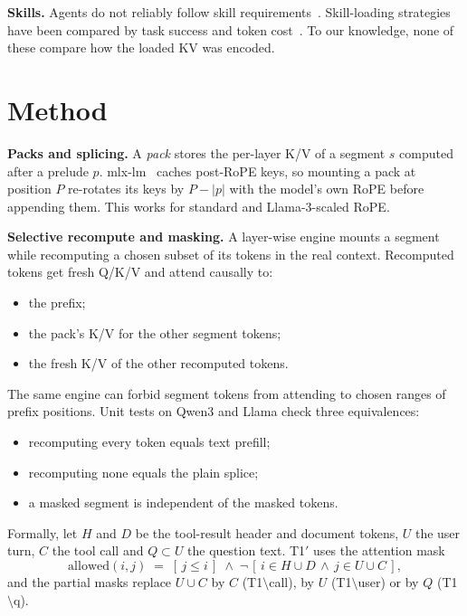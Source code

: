 \documentclass[10pt]{article}
\newcommand{\cond}[1]{\textsf{#1}}
\newcommand{\Mcall}{\cond{T1$\setminus$call}}
\newcommand{\Muser}{\cond{T1$\setminus$user}}
\newcommand{\Mq}{\cond{T1$\setminus$q}}
\begin{document}
\textbf{Skills.} Agents do not reliably follow skill requirements~\citep{li2026hexis}. Skill-loading strategies have been compared
by task success and token cost~\citep{zhang2026progressive,nakasuji2026skillblocks}. To our knowledge, none of these compare how
the loaded KV was encoded.

\section{Method}\label{sec:method}
\textbf{Packs and splicing.} A \emph{pack} stores the per-layer K/V of a segment $s$ computed after a prelude $p$.
mlx-lm~\citep{hannun2023mlx} caches post-RoPE keys, so mounting a pack at position $P$ re-rotates its keys by $P-|p|$ with the
model's own RoPE before appending them. This works for standard and Llama-3-scaled RoPE.

\textbf{Selective recompute and masking.} A layer-wise engine mounts a segment while recomputing a chosen subset of its tokens in the
real context. Recomputed tokens get fresh Q/K/V and attend causally to:
\begin{itemize}
\item the prefix;
\item the pack's K/V for the other segment tokens;
\item the fresh K/V of the other recomputed tokens.
\end{itemize}
The same engine can forbid segment tokens from attending to chosen ranges of prefix positions. Unit tests on Qwen3 and Llama check
three equivalences:
\begin{itemize}
\item recomputing every token equals text prefill;
\item recomputing none equals the plain splice;
\item a masked segment is independent of the masked tokens.
\end{itemize}
Formally, let $H$ and $D$ be the tool-result header and document tokens, $U$ the user turn, $C$ the tool call and $Q\subset U$ the
question text. \cond{T1$'$} uses the attention mask
\begin{equation*}
\mathrm{allowed}(i,j) \;=\; [\,j \le i\,] \;\wedge\; \neg\,[\, i \in H\cup D \,\wedge\, j \in U \cup C \,],
\end{equation*}
and the partial masks replace $U\cup C$ by $C$ (\Mcall), by $U$ (\Muser) or by $Q$ (\Mq).
\end{document}
